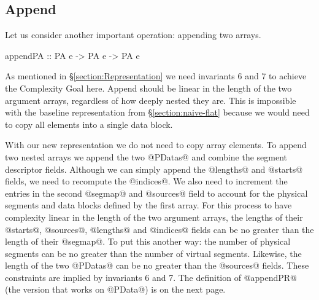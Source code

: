 \subsection{Append} 
\label{section:Append}
Let us consider another important operation: appending two arrays.
\begin{small}
\begin{code}
  appendPA :: PA e -> PA e -> PA e
\end{code}
\end{small}
As mentioned in \S\ref{section:Representation} we need invariants 6 and 7 to achieve the Complexity Goal here. Append should be linear in the length of the two argument arrays, regardless of how deeply nested they are. This is impossible with the baseline representation from \S\ref{section:naive-flat} because we would need to copy all elements into a single data block. 

With our new representation we do not need to copy array elements. To append two nested arrays we append the two @PDatas@ and combine the segment descriptor fields. Although we can simply append the @lengths@ and @starts@ fields, we need to recompute the @indices@. We also need to increment the entries in the second @segmap@ and @sources@ field to account for the physical segments and data blocks defined by the first array. For this process to have complexity linear in the length of the two argument arrays, the lengths of their @starts@, @sources@, @lengths@ and @indices@ fields can be no greater than the length of their @segmap@. To put this another way: the number of physical segments can be no greater than the number of virtual segments. Likewise, the length of the two @PDatas@ can be no greater than the @sources@ fields. These constraints are implied by invariants 6 and 7. The definition of @appendPR@ (the version that works on @PData@) is on the next page.

